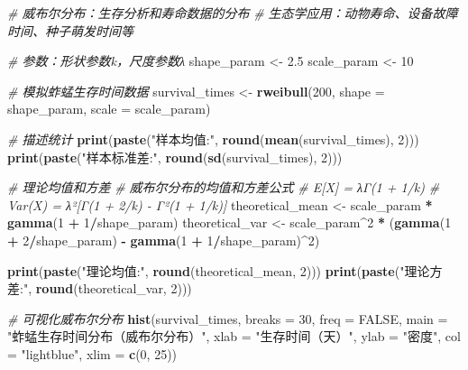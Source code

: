 \documentclass[
]{book}
\newenvironment{Shaded}{\begin{snugshade}}{\end{snugshade}}
\newcommand{\AttributeTok}[1]{\textcolor[rgb]{0.13,0.29,0.53}{#1}}
\newcommand{\CommentTok}[1]{\textcolor[rgb]{0.56,0.35,0.01}{\textit{#1}}}
\newcommand{\ConstantTok}[1]{\textcolor[rgb]{0.56,0.35,0.01}{#1}}
\newcommand{\DecValTok}[1]{\textcolor[rgb]{0.00,0.00,0.81}{#1}}
\newcommand{\FloatTok}[1]{\textcolor[rgb]{0.00,0.00,0.81}{#1}}
\newcommand{\FunctionTok}[1]{\textcolor[rgb]{0.13,0.29,0.53}{\textbf{#1}}}
\newcommand{\NormalTok}[1]{#1}
\newcommand{\OtherTok}[1]{\textcolor[rgb]{0.56,0.35,0.01}{#1}}
\newcommand{\SpecialCharTok}[1]{\textcolor[rgb]{0.81,0.36,0.00}{\textbf{#1}}}
\newcommand{\StringTok}[1]{\textcolor[rgb]{0.31,0.60,0.02}{#1}}
\begin{document}
\begin{Shaded}
\begin{Highlighting}[]
\CommentTok{\# 威布尔分布：生存分析和寿命数据的分布}
\CommentTok{\# 生态学应用：动物寿命、设备故障时间、种子萌发时间等}

\CommentTok{\# 参数：形状参数k，尺度参数λ}
\NormalTok{shape\_param }\OtherTok{\textless{}{-}} \FloatTok{2.5}
\NormalTok{scale\_param }\OtherTok{\textless{}{-}} \DecValTok{10}

\CommentTok{\# 模拟蚱蜢生存时间数据}
\NormalTok{survival\_times }\OtherTok{\textless{}{-}} \FunctionTok{rweibull}\NormalTok{(}\DecValTok{200}\NormalTok{, }\AttributeTok{shape =}\NormalTok{ shape\_param, }\AttributeTok{scale =}\NormalTok{ scale\_param)}

\CommentTok{\# 描述统计}
\FunctionTok{print}\NormalTok{(}\FunctionTok{paste}\NormalTok{(}\StringTok{"样本均值:"}\NormalTok{, }\FunctionTok{round}\NormalTok{(}\FunctionTok{mean}\NormalTok{(survival\_times), }\DecValTok{2}\NormalTok{)))}
\FunctionTok{print}\NormalTok{(}\FunctionTok{paste}\NormalTok{(}\StringTok{"样本标准差:"}\NormalTok{, }\FunctionTok{round}\NormalTok{(}\FunctionTok{sd}\NormalTok{(survival\_times), }\DecValTok{2}\NormalTok{)))}

\CommentTok{\# 理论均值和方差}
\CommentTok{\# 威布尔分布的均值和方差公式}
\CommentTok{\# E[X] = λΓ(1 + 1/k)}
\CommentTok{\# Var(X) = λ²[Γ(1 + 2/k) {-} Γ²(1 + 1/k)]}
\NormalTok{theoretical\_mean }\OtherTok{\textless{}{-}}\NormalTok{ scale\_param }\SpecialCharTok{*} \FunctionTok{gamma}\NormalTok{(}\DecValTok{1} \SpecialCharTok{+} \DecValTok{1}\SpecialCharTok{/}\NormalTok{shape\_param)}
\NormalTok{theoretical\_var }\OtherTok{\textless{}{-}}\NormalTok{ scale\_param}\SpecialCharTok{\^{}}\DecValTok{2} \SpecialCharTok{*}\NormalTok{ (}\FunctionTok{gamma}\NormalTok{(}\DecValTok{1} \SpecialCharTok{+} \DecValTok{2}\SpecialCharTok{/}\NormalTok{shape\_param) }\SpecialCharTok{{-}} \FunctionTok{gamma}\NormalTok{(}\DecValTok{1} \SpecialCharTok{+} \DecValTok{1}\SpecialCharTok{/}\NormalTok{shape\_param)}\SpecialCharTok{\^{}}\DecValTok{2}\NormalTok{)}

\FunctionTok{print}\NormalTok{(}\FunctionTok{paste}\NormalTok{(}\StringTok{"理论均值:"}\NormalTok{, }\FunctionTok{round}\NormalTok{(theoretical\_mean, }\DecValTok{2}\NormalTok{)))}
\FunctionTok{print}\NormalTok{(}\FunctionTok{paste}\NormalTok{(}\StringTok{"理论方差:"}\NormalTok{, }\FunctionTok{round}\NormalTok{(theoretical\_var, }\DecValTok{2}\NormalTok{)))}

\CommentTok{\# 可视化威布尔分布}
\FunctionTok{hist}\NormalTok{(survival\_times, }\AttributeTok{breaks =} \DecValTok{30}\NormalTok{, }\AttributeTok{freq =} \ConstantTok{FALSE}\NormalTok{,}
     \AttributeTok{main =} \StringTok{"蚱蜢生存时间分布（威布尔分布）"}\NormalTok{,}
     \AttributeTok{xlab =} \StringTok{"生存时间（天）"}\NormalTok{, }\AttributeTok{ylab =} \StringTok{"密度"}\NormalTok{,}
     \AttributeTok{col =} \StringTok{"lightblue"}\NormalTok{, }\AttributeTok{xlim =} \FunctionTok{c}\NormalTok{(}\DecValTok{0}\NormalTok{, }\DecValTok{25}\NormalTok{))}


\end{Highlighting}
\end{Shaded}
\end{document}

